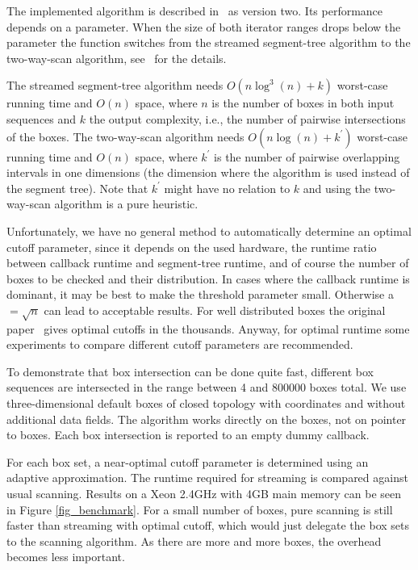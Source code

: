 The implemented algorithm is described in~\cite{cgal:ze-fsbi-02} as
version two.  Its performance depends on a  parameter.
When the size of both iterator ranges drops below the 
parameter the function switches from the streamed segment-tree
algorithm to the two-way-scan algorithm, see~\cite{cgal:ze-fsbi-02}
for the details.

The streamed segment-tree algorithm needs $O(n \log^3 (n) + k)$
worst-case running time and $O(n)$ space, where $n$ is the number of
boxes in both input sequences and $k$ the output complexity, i.e., the
number of pairwise intersections of the boxes. The two-way-scan
algorithm needs $O(n \log (n) + k^\prime)$
worst-case running time and $O(n)$ space, where $k^\prime$ is the
number of pairwise overlapping intervals in one dimensions (the
dimension where the algorithm is used instead of the segment
tree). Note that $k^\prime$ might have no relation to $k$ and using
the two-way-scan algorithm is a pure heuristic.

Unfortunately, we have no general method to automatically determine an
optimal cutoff parameter, since it depends on the used hardware, the
runtime ratio between callback runtime and segment-tree runtime, and
of course the number of boxes to be checked and their distribution. In
cases where the callback runtime is dominant, it may be best to make
the threshold parameter small. Otherwise a $=\sqrt{n}$ can
lead to acceptable results. For well distributed boxes the original
paper~\cite{cgal:ze-fsbi-02} gives optimal cutoffs in the thousands.
Anyway, for optimal runtime some experiments to compare different
cutoff parameters are recommended.

To demonstrate that box intersection can be done quite fast, different
box sequences are intersected in the range between 4 and 800000 boxes
total.  We use three-dimensional default boxes of closed topology with
 coordinates and without additional data fields.  The
algorithm works directly on the boxes, not on pointer to boxes. Each
box intersection is reported to an empty dummy callback.

For each box set, a near-optimal cutoff parameter is determined using
an adaptive approximation. The runtime required for streaming is
compared against usual scanning.  Results on a Xeon 2.4GHz with 4GB
main memory can be seen in Figure \ref{fig_benchmark}. For a small
number of boxes, pure scanning is still faster than streaming with
optimal cutoff, which would just delegate the box sets to the scanning
algorithm. As there are more and more boxes, the overhead becomes less
important. 

